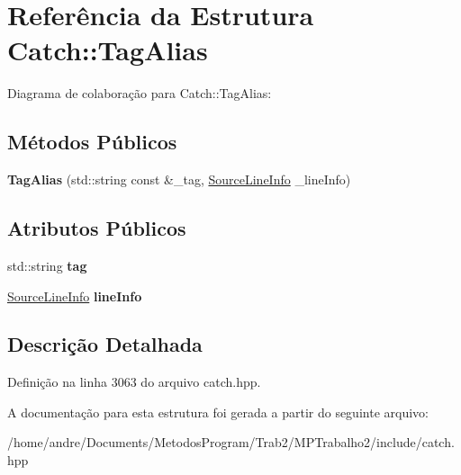 \hypertarget{structCatch_1_1TagAlias}{}\section{Referência da Estrutura Catch\+:\+:Tag\+Alias}
\label{structCatch_1_1TagAlias}


Diagrama de colaboração para Catch\+:\+:Tag\+Alias\+:
\subsection*{Métodos Públicos}
\begin{DoxyCompactItemize}
\item 
{\bfseries Tag\+Alias} (std\+::string const \&\+\_\+tag, \hyperlink{structCatch_1_1SourceLineInfo}{Source\+Line\+Info} \+\_\+line\+Info)\hypertarget{structCatch_1_1TagAlias_ae5a030edfbc8e37f28310d4ca599396c}{}\label{structCatch_1_1TagAlias_ae5a030edfbc8e37f28310d4ca599396c}

\end{DoxyCompactItemize}
\subsection*{Atributos Públicos}
\begin{DoxyCompactItemize}
\item 
std\+::string {\bfseries tag}\hypertarget{structCatch_1_1TagAlias_a950183883ab17c90d0fab16b966b6e2d}{}\label{structCatch_1_1TagAlias_a950183883ab17c90d0fab16b966b6e2d}

\item 
\hyperlink{structCatch_1_1SourceLineInfo}{Source\+Line\+Info} {\bfseries line\+Info}\hypertarget{structCatch_1_1TagAlias_a2f51fe0b3c052561275d26b6eb88f702}{}\label{structCatch_1_1TagAlias_a2f51fe0b3c052561275d26b6eb88f702}

\end{DoxyCompactItemize}


\subsection{Descrição Detalhada}


Definição na linha 3063 do arquivo catch.\+hpp.



A documentação para esta estrutura foi gerada a partir do seguinte arquivo\+:\begin{DoxyCompactItemize}
\item 
/home/andre/\+Documents/\+Metodos\+Program/\+Trab2/\+M\+P\+Trabalho2/include/catch.\+hpp\end{DoxyCompactItemize}
